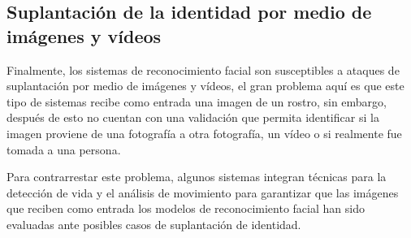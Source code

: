 \subsection{Suplantación de la identidad por medio de imágenes y vídeos}

Finalmente, los sistemas de reconocimiento facial son susceptibles a ataques de suplantación por medio de imágenes y vídeos, el gran problema aquí es que este tipo de sistemas recibe como entrada una imagen de un rostro, sin embargo, después de esto no cuentan con una validación que permita identificar si la imagen proviene de una fotografía a otra fotografía, un vídeo o si realmente fue tomada a una persona. \cite{EA4}

Para contrarrestar este problema, algunos sistemas integran técnicas para la detección de vida y el análisis de movimiento para garantizar que las imágenes que reciben como entrada los modelos de reconocimiento facial han sido evaluadas ante posibles casos de suplantación de identidad.
